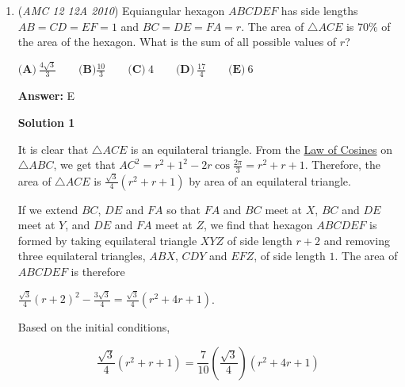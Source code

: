 \begin{enumerate}
 
- Leo M.

 


 



\textbf{Solution 3}

Two cases: 

 1st: Bernado gets a nine, there are in total $\binom{8}{2}\cdot \binom{8}{3}=1568$ ways such Bernado gets a bigger number

 2nd: Both of them get numbers from one to eight, because of symmetry, they have equal chance of getting a bigger number. Thus, there are $\frac{(\binom{8}{3})^2-\binom{8}{3}}{2}=1540$ ways

 And there are in total $\binom{9}{3}\cdot \binom{8}{3}$ ways to pick numbers, the possibility is $\frac{1568+1540}{4704}=\frac{37}{56}$



	\item (\textit{AMC 12 12A 2010}) Equiangular hexagon $ABCDEF$ has side lengths $AB=CD=EF=1$ and $BC=DE=FA=r$. The area of $\triangle ACE$ is $70\%$ of the area of the hexagon. What is the sum of all possible values of $r$?


 $\textbf{(A)}\ \frac{4\sqrt{3}}{3} \qquad \textbf{(B)} \frac{10}{3} \qquad \textbf{(C)}\ 4 \qquad \textbf{(D)}\ \frac{17}{4} \qquad \textbf{(E)}\ 6$

 \textbf{Answer: }E



\textbf{Solution 1}

It is clear that $\triangle ACE$ is an equilateral triangle. From the \href{https://artofproblemsolving.com/wiki/index.php?title=Law\_of\_Cosines}{Law of Cosines} on $\triangle ABC$, we get that $AC^2 = r^2+1^2-2r\cos{\frac{2\pi}{3}} = r^2+r+1$. Therefore, the area of $\triangle ACE$ is $\frac{\sqrt{3}}{4}(r^2+r+1)$ by area of an equilateral triangle.

 If we extend $BC$, $DE$ and $FA$ so that $FA$ and $BC$ meet at $X$, $BC$ and $DE$ meet at $Y$, and $DE$ and $FA$ meet at $Z$, we find that hexagon $ABCDEF$ is formed by taking equilateral triangle $XYZ$ of side length $r+2$ and removing three equilateral triangles, $ABX$, $CDY$ and $EFZ$, of side length $1$. The area of $ABCDEF$ is therefore

 $\frac{\sqrt{3}}{4}(r+2)^2-\frac{3\sqrt{3}}{4} = \frac{\sqrt{3}}{4}(r^2+4r+1)$.

 
Based on the initial conditions,

 
 \[\frac{\sqrt{3}}{4}(r^2+r+1) = \frac{7}{10}\left(\frac{\sqrt{3}}{4}\right)(r^2+4r+1)\]


\end{enumerate}
